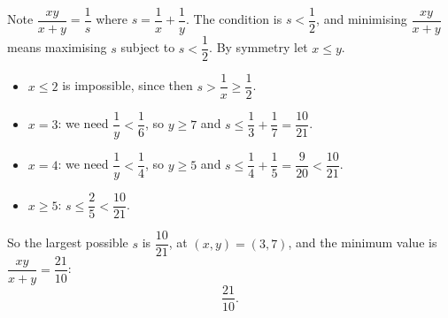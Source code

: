 Note $\dfrac{xy}{x+y}=\dfrac1{s}$ where $s=\dfrac1x+\dfrac1y$. The condition is $s<\dfrac12$, and minimising $\dfrac{xy}{x+y}$ means maximising $s$ subject to $s<\dfrac12$. By symmetry let $x\le y$.
\begin{itemize}
\item $x\le2$ is impossible, since then $s>\dfrac1x\ge\dfrac12$.
\item $x=3$: we need $\dfrac1y<\dfrac16$, so $y\ge7$ and $s\le\dfrac13+\dfrac17=\dfrac{10}{21}$.
\item $x=4$: we need $\dfrac1y<\dfrac14$, so $y\ge5$ and $s\le\dfrac14+\dfrac15=\dfrac9{20}<\dfrac{10}{21}$.
\item $x\ge5$: $s\le\dfrac25<\dfrac{10}{21}$.
\end{itemize}
So the largest possible $s$ is $\dfrac{10}{21}$, at $(x,y)=(3,7)$, and the minimum value is $\dfrac{xy}{x+y}=\dfrac{21}{10}$:
\[\boxed{\dfrac{21}{10}}.\]
